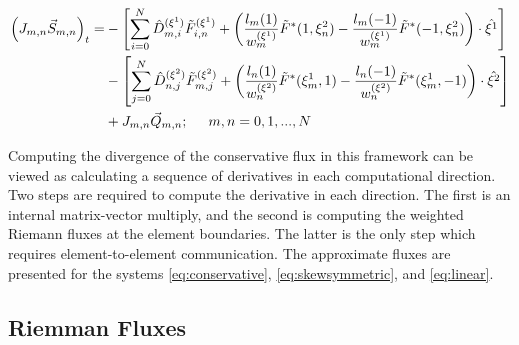 \documentclass{softwaremanual}
\begin{document}
 \begin{equation}
 \begin{split}
 \left( J_{m,n} \vec{S}_{m,n} \right)_t =  &-\left[\sum_{i=0}^{N}\hat{D}^{(\xi^1)}_{m,i} \tilde{F}^{(\xi^1)}_{i,n}   + \left( \frac{ l_m(1)}{w^{(\xi^1)}_m} \tilde{F}^{*}(1,\xi^2_n) - \frac{ l_m(-1)}{w^{(\xi^1)}_m} \tilde{F}^{*}(-1,\xi^2_n) \right) \cdot \hat{\xi^1} \right] \\
  &-\left[ \sum_{j=0}^{N}\hat{D}^{(\xi^2)}_{n,j} \tilde{F}^{(\xi^2)}_{m,j}  + \left( \frac{l_n(1)}{w^{(\xi^2)}_n} \tilde{F}^{*}(\xi^1_m,1)  -  \frac{l_n(-1)}{w^{(\xi^2)}_n} \tilde{F}^{*}(\xi^1_m,-1) \right)\cdot \hat{\xi^2}  \right] \\ 
 &+ J_{m,n}\vec{Q}_{m,n}; \hspace{5mm} m,n=0,1,...,N
\end{split} \label{eq:discrete2d_system} 
 \end{equation}

 Computing the divergence of the conservative flux in this framework can be viewed as calculating a sequence of derivatives in each computational direction. Two steps are required to compute the derivative in each direction. The first is an internal matrix-vector multiply, and the second is computing the weighted Riemann fluxes at the element boundaries. The latter is the only step which requires element-to-element communication. The approximate fluxes are presented for the systems \eqref{eq:conservative}, \eqref{eq:skewsymmetric}, and \eqref{eq:linear}.

\subsection{Riemman Fluxes}
\end{document}
